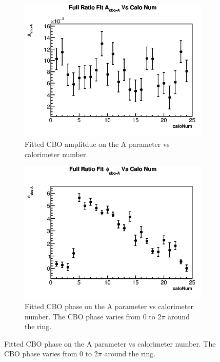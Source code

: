 \begin{figure}[h]
\begin{subfigure}[t]{0.4\textwidth}
	    \end{subfigure}%
	    \vspace{4mm}
	    \begin{subfigure}[t]{0.4\textwidth}
		    \centering
			\includegraphics[width=\textwidth]{RatioCBOFit_A_cbo-A_Vs_Calo_Canv}
		    \caption{Fitted CBO amplitdue on the A parameter vs calorimeter number.}
	    \end{subfigure}
	    \hspace{4mm}
	    \begin{subfigure}[t]{0.4\textwidth}
		    \centering
			\includegraphics[width=\textwidth]{RatioCBOFit_phi_cbo-A_Vs_Calo_Canv}
		    \caption{Fitted CBO phase on the A parameter vs calorimeter number. The CBO phase varies from 0 to 2$\pi$ around the ring.}

\end{subfigure}
\end{figure}
